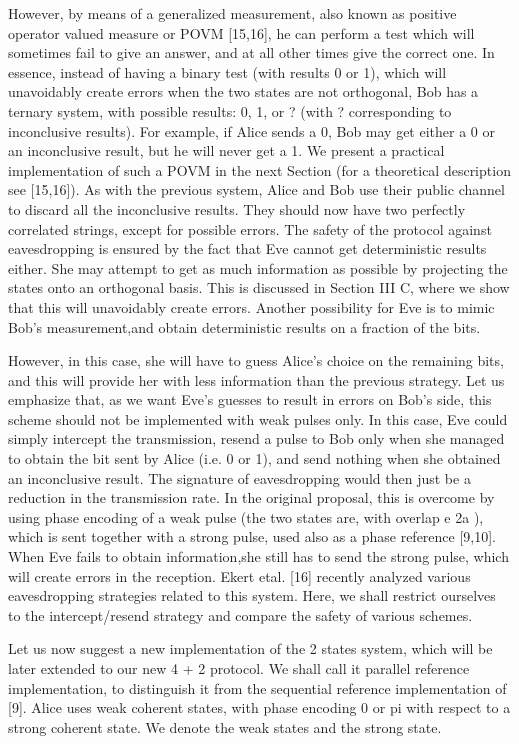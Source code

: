 However, by means of a generalized measurement, also known as positive operator valued measure or POVM [15,16], he can perform a test which will sometimes fail to give an answer, and at all other times give the correct one. In essence, instead of having a binary test (with results 0 or 1), which will unavoidably create errors when the two states are not orthogonal, Bob has a ternary system, with possible results: 0, 1, or ? (with ? corresponding to inconclusive results). For example, if Alice sends a 0, Bob may get either a 0 or an inconclusive result, but he will never get a 1. We present a practical implementation of such a POVM in the next Section (for a theoretical description see [15,16]). As with the previous system, Alice and Bob use their public channel to discard all the inconclusive results. They should now have two perfectly correlated strings, except for possible errors. The safety of the protocol against eavesdropping is ensured by the fact that Eve cannot get deterministic results either. She may attempt to get as much information as possible by projecting the states onto an orthogonal basis. This is discussed in Section III C, where we show that this will unavoidably create errors. Another possibility for Eve is to mimic Bob’s measurement,and obtain deterministic results on a fraction of the bits. 

However, in this case, she will have to guess Alice’s choice on the remaining bits, and this will provide her with less information than the previous strategy. Let us emphasize that, as we want Eve’s guesses to result in errors on Bob’s side, this scheme should not be implemented with weak pulses only. In this case, Eve could simply intercept the transmission, resend a pulse to Bob only when she managed to obtain the bit sent by Alice (i.e. 0 or 1), and send nothing when she obtained an inconclusive result. The signature of eavesdropping would then just be a reduction in the transmission rate. In the original proposal, this is overcome by using phase encoding of a weak pulse (the two states are, with overlap e 2a ), which is sent together with a strong pulse, used also as a phase reference [9,10]. When Eve fails to obtain information,she still has to send the strong pulse, which will create errors in the reception. Ekert etal. [16] recently analyzed various eavesdropping strategies related to this system. Here, we shall restrict ourselves to the intercept/resend strategy and compare the safety of various schemes.

Let us now suggest a new implementation of the 2 states system, which will be later extended to our new 4 + 2 protocol. We shall call it parallel reference implementation, to distinguish it from the sequential reference implementation of [9]. Alice uses weak coherent states, with phase encoding 0 or pi with respect to a strong coherent state. We denote the weak states  and the strong state.

